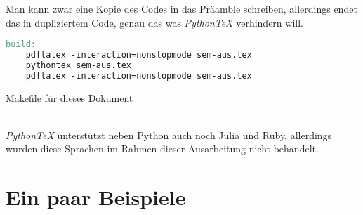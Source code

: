 \documentclass[11pt,a4paper]{article}
\newcommand{\pythontex}{\textit{Python\TeX{}}}
\begin{document}
%
Man kann zwar eine Kopie des Codes in das Präamble schreiben, allerdings endet das in dupliziertem Code, genau das was \pythontex{} verhindern will.
%
\begin{listing}[t]
  \begin{lstlisting}[language=make,columns=flexible]
build:
	pdflatex -interaction=nonstopmode sem-aus.tex
	pythontex sem-aus.tex
	pdflatex -interaction=nonstopmode sem-aus.tex
  \end{lstlisting}
  \caption{Makefile für dieses Dokument}
  \label{lst:makefile}
\end{listing}
%
\\
%
\pythontex{} unterstützt neben Python auch noch Julia und Ruby, allerdings wurden diese Sprachen im Rahmen dieser Ausarbeitung nicht behandelt.
\section{Ein paar Beispiele}
\end{document}
